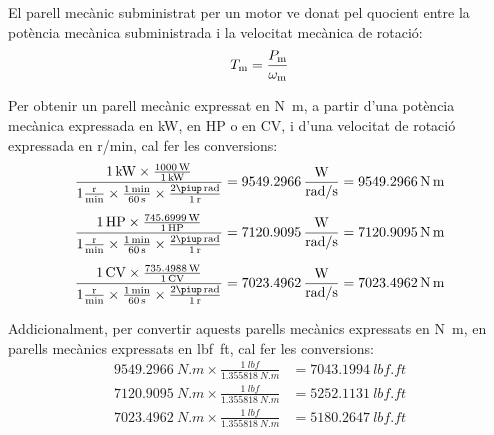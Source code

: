 El parell mecànic subministrat per un motor ve donat pel quocient entre la potència mecànica subministrada i la velocitat mecànica de rotació:
\begin{equation}\index{parell!mecànic}
    T\ped{m} = \frac{P\ped{m}}{\omega\ped{m}}\label{eq:T-P-w}
\end{equation}

Per  obtenir un  parell mecànic expressat en \si{N.m}, a partir d'una potència mecànica expressada en kW, en HP o en CV, i d'una velocitat de rotació expressada en \si{r/min}, cal  fer les conversions:
\begin{subequations}
\begin{align}
    \frac{\SI{1}{kW} \times \frac{\SI{1000}{W}}{\SI{1}{kW}}}{1\frac{\si{r}}{\si{min}} \times \frac{\SI{1}{min}}{\SI{60}{s}} \times \frac{2\piup\,\si{rad}}{\SI{1}{r}}} &=  \num{9549,2966}\, \frac{\si{W}}{\si{rad/s}} = \SI{9549,2966}{N.m} \\[1ex]
    \frac{\SI{1}{HP} \times \frac{\SI{745,6999}{W}}{\SI{1}{HP}}}{1\frac{\si{r}}{\si{min}} \times \frac{\SI{1}{min}}{\SI{60}{s}} \times \frac{2\piup\,\si{rad}}{\SI{1}{r}}} &=  \num{7120,9095}\, \frac{\si{W}}{\si{rad/s}} = \SI{7120,9095}{N.m} \\[1ex]
    \frac{\SI{1}{CV} \times \frac{\SI{735,4988}{W}}{\SI{1}{CV}}}{1\frac{\si{r}}{\si{min}} \times \frac{\SI{1}{min}}{\SI{60}{s}} \times \frac{2\piup\,\si{rad}}{\SI{1}{r}}} &=  \num{7023,4962}\, \frac{\si{W}}{\si{rad/s}} = \SI{7023,4962}{N.m}
\end{align}
\end{subequations}

Addicionalment, per  convertir aquests parells mecànics expressats en \si{N.m}, en parells mecànics expressats en \si{lbf.ft}, cal  fer les conversions:
\begin{subequations}
\begin{align}
    \SI{9549,2966}{N.m} \times \frac{\SI{1}{lbf}}{\SI{1,355818}{N.m}} &= \SI{7043,1994}{lbf.ft} \\[1ex]
    \SI{7120,9095}{N.m} \times \frac{\SI{1}{lbf}}{\SI{1,355818}{N.m}} &= \SI{5252,1131}{lbf.ft} \\[1ex]
    \SI{7023,4962}{N.m} \times \frac{\SI{1}{lbf}}{\SI{1,355818}{N.m}} &= \SI{5180,2647}{lbf.ft}
\end{align}
\end{subequations}

